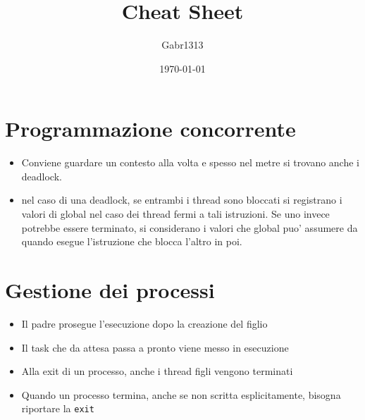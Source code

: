 \documentclass[12pt, a4paper]{report}
\title{Cheat Sheet}
\author{Gabr1313}
\date{\today}
\begin{document}
\justify
\sloppy
\maketitle

\section*{Programmazione concorrente}
\begin{itemize}
	\item Conviene guardare un contesto alla volta e spesso nel metre si trovano
		anche i deadlock.
	\item nel caso di una deadlock, se entrambi i thread sono bloccati si
		registrano i valori di global nel caso dei thread fermi a tali
		istruzioni. Se uno invece potrebbe essere terminato, si considerano i
		valori che global puo' assumere da quando esegue l'istruzione che blocca
		l'altro in poi.
\end{itemize}

\newpage
\section*{Gestione dei processi}
\begin{itemize}
	\item Il padre prosegue l'esecuzione dopo la creazione del figlio
	\item Il task che da attesa passa a pronto viene messo in esecuzione
	\item Alla exit di un processo, anche i thread figli vengono terminati
	\item Quando un processo termina, anche se non scritta esplicitamente,
		bisogna riportare la \texttt{exit}
\end{itemize}


\newpage
\end{document}
